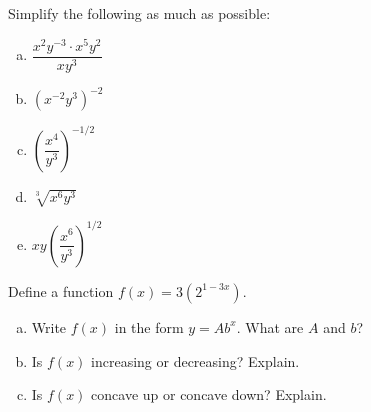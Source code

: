 \documentclass[11pt,letterpaper]{article}
\begin{document}

 Simplify the following as much as possible:
	\begin{enumerate}[(a)]
	\item $\dfrac{x^2 y^{-3} \cdot x^5 y^2}{x y^3}$
	\item $\left( x^{-2} y^3 \right)^{-2}$
	\item $\left( \dfrac{x^4}{y^3} \right)^{-1/2}$
	\item $\sqrt[3]{x^6 y^3}$
	\item $x y \left( \dfrac{x^6}{y^3} \right)^{1/2}$
	\end{enumerate}



\newpage



 Define a function $f(x)= 3 \left(2^{1 - 3x} \right)$.
	\begin{enumerate}[(a)]
	\item Write $f(x)$ in the form $y= Ab^x$. What are $A$ and $b$?
	\item Is $f(x)$ increasing or decreasing? Explain.
	\item Is $f(x)$ concave up or concave down? Explain. 
	\end{enumerate}
\end{document}
